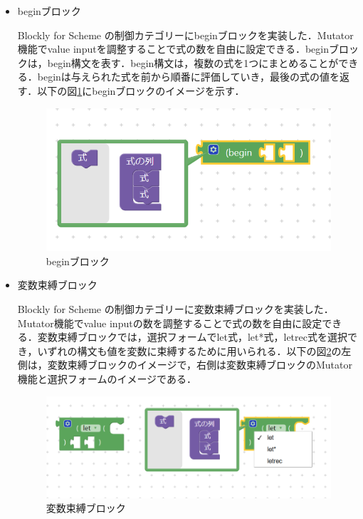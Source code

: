 \documentclass{risepaper}
\begin{document}
\begin{itemize}
\item beginブロック

Blockly for Scheme の制御カテゴリーにbeginブロックを実装した．Mutator機能でvalue inputを調整することで式の数を自由に設定できる．beginブロックは，begin構文を表す．begin構文は，複数の式を1つにまとめることができる．beginは与えられた式を前から順番に評価していき，最後の式の値を返す．以下の図\ref{fig:scheme_begin}にbeginブロックのイメージを示す．

\begin{figure}[h]
\begin{center}
\includegraphics[scale=0.5]{img/scheme_begin.PNG}
\caption{beginブロック}%
\label{fig:scheme_begin}
\end{center}%
\end{figure}%

\item 変数束縛ブロック

Blockly for Scheme の制御カテゴリーに変数束縛ブロックを実装した．Mutator機能でvalue inputの数を調整することで式の数を自由に設定できる．変数束縛ブロックでは，選択フォームでlet式，let*式，letrec式を選択でき，いずれの構文も値を変数に束縛するために用いられる．以下の図\ref{fig:scheme_binding}の左側は，変数束縛ブロックのイメージで，右側は変数束縛ブロックのMutator機能と選択フォームのイメージである．

\begin{figure}[h]
\begin{center}
\includegraphics[scale=0.5]{img/scheme_binding.PNG}
\caption{変数束縛ブロック}%
\label{fig:scheme_binding}
\end{center}%
\end{figure}%


\end{itemize}
\end{document}
